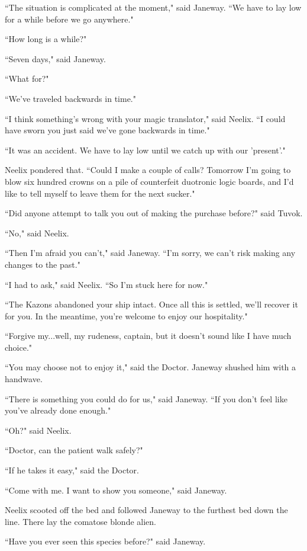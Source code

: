 \documentclass[twoside,letterpaper,12pt]{memoir}
\begin{document}
``The situation is complicated at the moment," said Janeway. ``We have to lay low for a while before we go anywhere." 

``How long is a while?" 

``Seven days," said Janeway. 

``What for?" 

``We've traveled backwards in time." 

``I think something's wrong with your magic translator," said Neelix. ``I could have sworn you just said we've gone backwards in time." 

``It was an accident. We have to lay low until we catch up with our 'present'." 

Neelix pondered that. ``Could I make a couple of calls? Tomorrow I'm going to blow six hundred crowns on a pile of counterfeit duotronic logic boards, and I'd like to tell myself to leave them for the next sucker." 

``Did anyone attempt to talk you out of making the purchase before?" said Tuvok. 

``No," said Neelix. 

``Then I'm afraid you can't," said Janeway. ``I'm sorry, we can't risk making any changes to the past." 

``I had to ask," said Neelix. ``So I'm stuck here for now." 

``The Kazons abandoned your ship intact. Once all this is settled, we'll recover it for you. In the meantime, you're welcome to enjoy our hospitality." 

``Forgive my...well, my rudeness, captain, but it doesn't sound like I have much choice." 

``You may choose not to enjoy it," said the Doctor. Janeway shushed him with a handwave. 

``There is something you could do for us," said Janeway. ``If you don't feel like you've already done enough." 

``Oh?" said Neelix. 

``Doctor, can the patient walk safely?" 

``If he takes it easy," said the Doctor. 

``Come with me. I want to show you someone," said Janeway. 

Neelix scooted off the bed and followed Janeway to the furthest bed down the line. There lay the comatose blonde alien. 

``Have you ever seen this species before?" said Janeway. 
\end{document}
